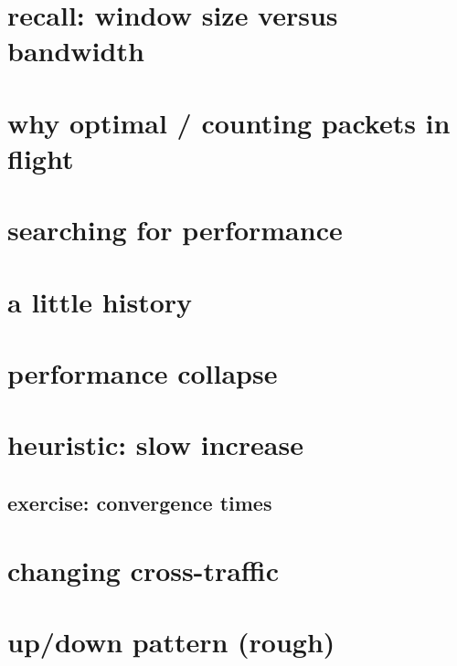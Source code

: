 
\section{recall: window size versus bandwidth}



\section{why optimal / counting packets in flight}


\section{searching for performance}


\section{a little history}



\section{performance collapse}


\section{heuristic: slow increase}


\subsection{exercise: convergence times}



\section{changing cross-traffic}



\section{up/down pattern (rough)}


